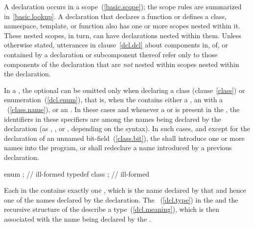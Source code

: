 \pnum
{}%
%
A declaration occurs in a scope~(\ref{basic.scope}); the scope rules are
summarized in~\ref{basic.lookup}. A declaration that declares a function
or defines a class, namespace, template, or function also has one or
more scopes nested within it. These nested scopes, in turn, can have
declarations nested within them. Unless otherwise stated, utterances in
clause~\ref{dcl.dcl} about components in, of, or contained by a
declaration or subcomponent thereof refer only to those components of
the declaration that are \emph{not} nested within scopes nested within
the declaration.

\pnum
{}%
%
In a , the optional
 can be omitted only when declaring a
class (clause~\ref{class}) or enumeration~(\ref{dcl.enum}), that is,
when the  contains either a
, an  with
a ~(\ref{class.name}), or an
. In these cases and whenever a
 or  is present in
the , the identifiers in these specifiers
are among the names being declared by the declaration (as
, , or
, depending on the syntax). In such cases, and
except for the declaration of an unnamed bit-field~(\ref{class.bit}),
the  shall introduce one or more names into
the program, or shall redeclare a name introduced by a previous
declaration.
\enterexample

\begin{codeblock}
enum { };			// ill-formed
typedef class { };		// ill-formed
\end{codeblock}
\exitexampleb

\pnum
Each  in the 
contains exactly one , which is the name
declared by that  and hence one of the names
declared by the declaration. The
~(\ref{dcl.type}) in the
 and the recursive 
structure of the  describe a
type~(\ref{dcl.meaning}), which is then associated with the name being
declared by the .

